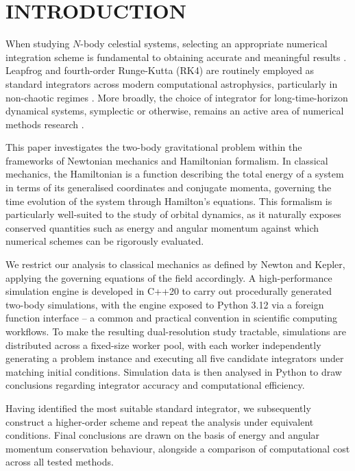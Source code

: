 \section{INTRODUCTION}
When studying $N$-body celestial systems, selecting an appropriate numerical integration scheme is fundamental to obtaining accurate and meaningful results \citep{aarseth1975}.
Leapfrog and fourth-order Runge-Kutta (RK4) are routinely employed as standard integrators across modern computational astrophysics, particularly in non-chaotic regimes \citep{bagla2005}.
More broadly, the choice of integrator for long-time-horizon dynamical systems, symplectic or otherwise, remains an active area of numerical methods research \citep{razafindralandy2019}.

This paper investigates the two-body gravitational problem within the frameworks of Newtonian mechanics and Hamiltonian formalism.
In classical mechanics, the Hamiltonian is a function describing the total energy of a system in terms of its generalised coordinates and conjugate momenta, governing the time evolution of the system through Hamilton's equations.
This formalism is particularly well-suited to the study of orbital dynamics, as it naturally exposes conserved quantities such as energy and angular momentum against which numerical schemes can be rigorously evaluated.

We restrict our analysis to classical mechanics as defined by Newton and Kepler, applying the governing equations of the field accordingly.
A high-performance simulation engine is developed in C++20 to carry out procedurally generated two-body simulations, with the engine exposed to Python 3.12 via a foreign function interface – a common and practical convention in scientific computing workflows.
To make the resulting dual-resolution study tractable, simulations are distributed across a fixed-size worker pool, with each worker independently generating a problem instance and executing all five candidate integrators under matching initial conditions.
Simulation data is then analysed in Python to draw conclusions regarding integrator accuracy and computational efficiency.

Having identified the most suitable standard integrator, we subsequently construct a higher-order scheme and repeat the analysis under equivalent conditions.
Final conclusions are drawn on the basis of energy and angular momentum conservation behaviour, alongside a comparison of computational cost across all tested methods.